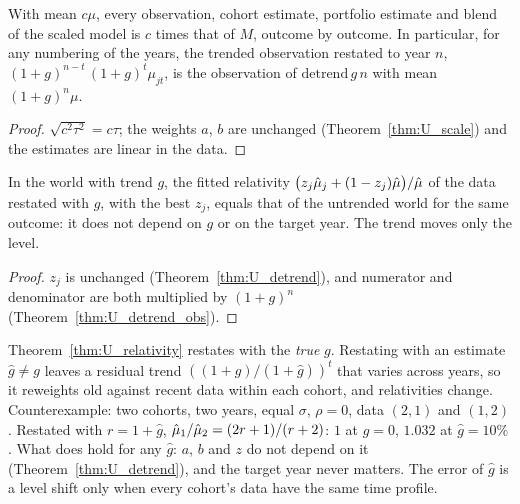 \begin{theorem}\label{thm:U_detrend_obs}
  \leanok
  With mean $c\mu$, every observation, cohort estimate, portfolio estimate
  and blend of the scaled model is $c$ times that of $M$, outcome by outcome.
  In particular, for any numbering of the years, the trended observation
  restated to year $n$, $(1+g)^{n-t}\,(1+g)^t\mu_{jt}$, is the observation of
  $\mathrm{detrend}\,g\,n$ with mean $(1+g)^n\mu$.
\end{theorem}
\begin{proof}
  \leanok
  $\sqrt{c^2\tau^2} = c\tau$; the weights $a$, $b$ are unchanged
  (Theorem~\ref{thm:U_scale}) and the estimates are linear in the data.
\end{proof}

\begin{theorem}\label{thm:U_relativity}
  \leanok
  In the world with trend $g$, the fitted relativity
  $\bigl(z_j\hat\mu_j + (1-z_j)\hat\mu\bigr)/\hat\mu$ of the data restated with $g$, with
  the best $z_j$, equals that of the untrended world for the same outcome: it
  does not depend on $g$ or on the target year. The trend moves only the level.
\end{theorem}
\begin{proof}
  \leanok
  $z_j$ is unchanged (Theorem~\ref{thm:U_detrend}), and numerator and
  denominator are both multiplied by $(1+g)^n$ (Theorem~\ref{thm:U_detrend_obs}).
\end{proof}

\begin{remark}\label{rem:trend_estimated}
  Theorem~\ref{thm:U_relativity} restates with the \emph{true} $g$. Restating
  with an estimate $\hat g \ne g$ leaves a residual trend
  $((1+g)/(1+\hat g))^t$ that varies across years, so it reweights old against
  recent data within each cohort, and relativities change.
  Counterexample: two cohorts, two years, equal $\sigma$, $\rho = 0$, data
  $(2, 1)$ and $(1, 2)$. Restated with $r = 1+\hat g$, $\hat\mu_1/\hat\mu_2 = (2r+1)/(r+2)$:
  $1$ at $\hat g = 0$, $1.032$ at $\hat g = 10\%$. What does hold for any
  $\hat g$: $a$, $b$ and $z$ do not depend on it (Theorem~\ref{thm:U_detrend}),
  and the target year never matters. The error of $\hat g$ is a level shift
  only when every cohort's data have the same time profile.
\end{remark}

